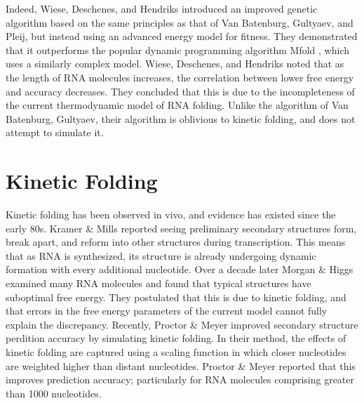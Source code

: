 \documentclass{cshonours}
\begin{document}
Indeed, Wiese, Deschenes, and Hendriks \cite{wiese2008rnapredict} introduced an improved
genetic algorithm based on the same principles as that of Van Batenburg, Gultyaev,
and Pleij, but instead using an advanced energy model for fitness. They demonstrated that it outperforms the popular dynamic programming algorithm
Mfold \cite{zuker2003mfold}, which uses a similarly complex model. Wiese, Deschenes, and Hendriks noted that as the length of RNA molecules increases, the correlation between lower free energy and accuracy decreases. They concluded that this is due to the incompleteness of the current thermodynamic model of RNA folding. Unlike the algorithm of Van Batenburg, Gultyaev, their algorithm is oblivious to kinetic folding, and does not attempt to simulate it.

\section{Kinetic Folding}
Kinetic folding has been observed in vivo, and evidence has existed since the early 80s. Kramer \& Mills \cite{kramer1981secondary} reported seeing preliminary secondary structures form, break apart, and reform into other structures during transcription. This means that as RNA is synthesized, its structure is already undergoing dynamic formation with every additional nucleotide. Over a decade later Morgan \& Higgs \cite{morgan1996evidence} examined many RNA molecules and found that typical structures have suboptimal free energy. They postulated that this is due to kinetic folding, and that errors in the free energy parameters of the current model cannot fully explain the discrepancy. Recently, Proctor \& Meyer \cite{proctor2013cofold} improved secondary structure perdition accuracy by simulating kinetic folding. In their method, the effects of kinetic folding are captured using a scaling function in which closer nucleotides are weighted higher than distant nucleotides. Proctor \& Meyer \cite{proctor2013cofold} reported that this improves prediction accuracy; particularly for RNA molecules comprising greater than 1000 nucleotides. 
\end{document}

